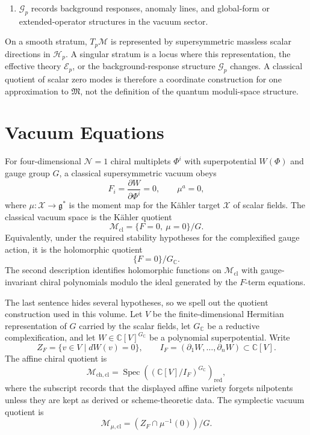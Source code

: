 \begin{definition}
\begin{enumerate}
\item \(\mathcal G_p\) records background responses, anomaly lines, and
global-form or extended-operator structures in the vacuum sector.
\end{enumerate}
On a smooth stratum, \(T_p\mathcal M\) is represented by supersymmetric
massless scalar directions in \(\mathcal H_p\).  A singular stratum is a locus
where this representation, the effective theory \(\mathcal E_p\), or the
background-response structure \(\mathcal G_p\) changes.  A classical quotient of
scalar zero modes is therefore a coordinate construction for one approximation
to \(\mathfrak M\), not the definition of the quantum moduli-space structure.
\end{definition}

\section{Vacuum Equations}

For four-dimensional \(\mathcal N=1\) chiral multiplets \(\Phi^i\) with
superpotential \(W(\Phi)\) and gauge group \(G\), a classical supersymmetric
vacuum obeys
\[
  F_i=\frac{\partial W}{\partial\Phi^i}=0,
  \qquad
  \mu^a=0,
\]
where \(\mu:\mathcal X\to\mathfrak g^\ast\) is the moment map for the
K\"ahler target \(\mathcal X\) of scalar fields.  The classical vacuum space is
the K\"ahler quotient
\[
  \mathcal M_{\mathrm{cl}}
  =
  \{F=0,\ \mu=0\}/G .
\]
Equivalently, under the required stability hypotheses for the complexified gauge
action, it is the holomorphic quotient
\[
  \{F=0\}/G_\mathbb C .
\]
The second description identifies holomorphic functions on
\(\mathcal M_{\mathrm{cl}}\) with gauge-invariant chiral polynomials modulo
the ideal generated by the \(F\)-term equations.

The last sentence hides several hypotheses, so we spell out the quotient
construction used in this volume.  Let \(V\) be the finite-dimensional Hermitian
representation of \(G\) carried by the scalar fields, let \(G_\mathbb C\) be a
reductive complexification, and let \(W\in\mathbb C[V]^{G_\mathbb C}\) be a
polynomial superpotential.  Write
\[
  Z_F=\{v\in V\mid dW(v)=0\},\qquad
  I_F=(\partial_1W,\ldots,\partial_nW)\subset\mathbb C[V].
\]
The affine chiral quotient is
\begin{equation}
  \mathcal M_{\mathrm{ch},\mathrm{cl}}
  =
  \operatorname{Spec}
  \left((\mathbb C[V]/I_F)^{G_\mathbb C}\right)_{\mathrm{red}},
  \label{eq:affine-chiral-quotient}
\end{equation}
where the subscript records that the displayed affine variety forgets
nilpotents unless they are kept as derived or scheme-theoretic data.  The
symplectic vacuum quotient is
\begin{equation}
  \mathcal M_{\mu,\mathrm{cl}}
  =
  (Z_F\cap\mu^{-1}(0))/G .
  \label{eq:symplectic-vacuum-quotient}
\end{equation}

